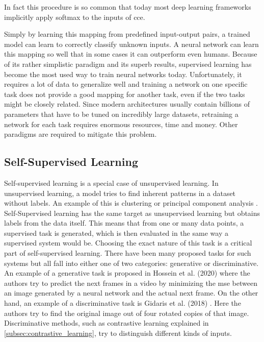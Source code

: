 In fact this procedure is so common that today most deep learning frameworks implicitly apply softmax to the inputs of \gls{cce}.

Simply by learning this mapping from predefined input-output pairs, a trained model can learn to correctly classify unknown inputs. A neural network can learn this mapping so well that in some cases it can outperform even humans. Because of its rather simplistic paradigm and its superb results, supervised learning has become the most used way to train neural networks today. Unfortunately, it requires a lot of data to generalize well and training a network on one specific task does not provide a good mapping for another task, even if the two tasks might be closely related. Since modern architectures usually contain billions of parameters that have to be tuned on incredibly large datasets, retraining a network for each task requires enormous resources, time and money. Other paradigms are required to mitigate this problem.

\subsection{Self-Supervised Learning}\label{subsec:self_supervised}

Self-supervised learning is a special case of unsupervised learning. In unsupervised learning, a model tries to find inherent patterns in a dataset without labels. An example of this is clustering or principal component analysis \cite{1901pca}. Self-Supervised learning has the same target as unsupervised learning but obtains labels from the data itself. This means that from one or many data points, a supervised task is generated, which is then evaluated in the same way a supervised system would be. Choosing the exact nature of this task is a critical part of self-supervised learning. There have been many proposed tasks for such systems but all fall into either one of two categories: generative or discriminative. An example of a generative task is proposed in Hossein et al. (2020) \cite{hosseini2020inceptioninspired} where the authors try to predict the next frames in a video by minimizing the \gls{mse} between an image generated by a neural network and the actual next frame. On the other hand, an example of a discriminative task is Gidaris et al. (2018) \cite{gidaris2018unsupervised}. Here the authors try to find the original image out of four rotated copies of that image. Discriminative methods, such as contrastive learning explained in \ref{subsec:contrastive_learning}, try to distinguish different kinds of inputs.

